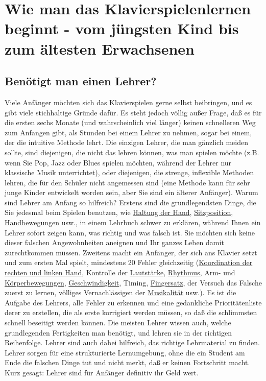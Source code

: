 
\section{Wie man das Klavierspielenlernen beginnt - vom jüngsten Kind bis zum ältesten Erwachsenen}\hypertarget{c1iii18}{}

\subsection{Benötigt man einen Lehrer?}\hypertarget{c1iii18a}{}

Viele Anfänger möchten sich das Klavierspielen gerne selbst beibringen, und es gibt viele stichhaltige Gründe dafür.
Es steht jedoch völlig außer Frage, daß es für die ersten sechs Monate (und wahrscheinlich viel länger) keinen schnelleren Weg zum Anfangen gibt, als Stunden bei einem Lehrer zu nehmen, sogar bei einem, der die intuitive Methode lehrt.
Die einzigen Lehrer, die man gänzlich meiden sollte, sind diejenigen, die nicht das lehren können, was man spielen möchte (z.B. wenn Sie Pop, Jazz oder Blues spielen möchten, während der Lehrer nur klassische Musik unterrichtet), oder diejenigen, die strenge, inflexible Methoden lehren, die für den Schüler nicht angemessen sind (eine Methode kann für sehr junge Kinder entwickelt worden sein, aber Sie sind ein älterer Anfänger).
Warum sind Lehrer am Anfang so hilfreich?
Erstens sind die grundlegendsten Dinge, die Sie jedesmal beim Spielen benutzen, wie \hyperlink{c1ii2}{Haltung der Hand}, \hyperlink{c1ii3}{Sitzposition}, \hyperlink{c1iii4}{Handbewegungen} usw., in einem Lehrbuch schwer zu erklären, während Ihnen ein Lehrer sofort zeigen kann, was richtig und was falsch ist.
Sie möchten sich keine dieser falschen Angewohnheiten aneignen und Ihr ganzes Leben damit zurechtkommen müssen.
Zweitens macht ein Anfänger, der sich ans Klavier setzt und zum ersten Mal spielt, mindestens 20 Fehler gleichzeitig (\hyperlink{c1ii25}{Koordination der rechten und linken Hand}, Kontrolle der \hyperlink{c1iii14d}{Lautstärke}, \hyperlink{c1iii1b}{Rhythmus}, Arm- und \hyperlink{c1iii4c}{Körperbewegungen}, \hyperlink{c1ii13}{Geschwindigkeit}, Timing, \hyperlink{c1ii18}{Fingersatz}, der Versuch das Falsche zuerst zu lernen, völliges Vernachlässigen der \hyperlink{c1iii14d}{Musikalität} usw.).
Es ist die Aufgabe des Lehrers, alle Fehler zu erkennen und eine gedankliche Prioritätenliste derer zu erstellen, die als erste korrigiert werden müssen, so daß die schlimmsten schnell beseitigt werden können.
Die meisten Lehrer wissen auch, welche grundlegenden Fertigkeiten man benötigt, und lehren sie in der richtigen Reihenfolge.
Lehrer sind auch dabei hilfreich, das richtige Lehrmaterial zu finden.
Lehrer sorgen für eine strukturierte Lernumgebung, ohne die ein Student am Ende die falschen Dinge tut und nicht merkt, daß er keinen Fortschritt macht.
Kurz gesagt: Lehrer sind für Anfänger definitiv ihr Geld wert.


